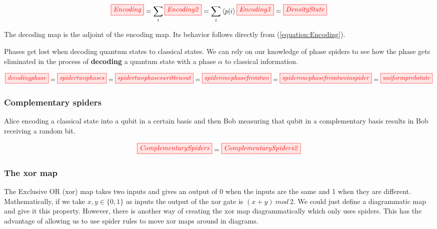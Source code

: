 \documentclass[]{article}
\begin{document}
\begin{equation}
	\label{equation:Encoding}
	\tikzfig{Encoding} = \sum\limits_{i} \tikzfig{Encoding2} = \sum\limits_{i} \bra{p}\ket{i} \tikzfig{Encoding3} = \tikzfig{DensityState}
\end{equation}

The decoding map is the adjoint of the encoding map. Its behavior follows directly from (\ref{equation:Encoding}).

Phases get lost when decoding quantum states to classical states. We can rely on our knowledge of phase spiders to see how the phase gets eliminated in the process of \textbf{decoding} a quantum state with a phase $ \alpha$ to classical information.

\begin{equation}
\label{eq:20}
\tikzfig{decodingphase} = \tikzfig{spidertwophases} = \tikzfig{spidertwophaseswrittenout} = \tikzfig{spideronephasefromtwo} = \tikzfig{spideronephasefromtwoinspider} =
\tikzfig{uniformprobstate}
\end{equation}

\subsubsection{Complementary spiders}
\label{complementarity}
Alice encoding a classical state into a qubit in a certain basis and then Bob measuring that qubit in a complementary basis results in Bob receiving a random bit.


\begin{equation}
	\label{equation:Complementarity}
	\tikzfig{ComplementarySpiders} = \tikzfig{ComplementarySpiders2}
\end{equation}

\subsubsection{The xor map}

\label{xorgate}

The Exclusive OR (xor) map takes two inputs and gives an output of 0 when the inputs are the same and 1 when they are different. Mathematically, if we take $x, y \in \{0,1\} $ as inputs the output of the xor gate is $(x + y)~mod~2$. We could just define a diagrammatic map and give it this property. However, there is another way of creating the xor map diagrammatically which only uses spiders. This has the advantage of allowing us to use spider rules to move xor maps around in diagrams.
\end{document}
